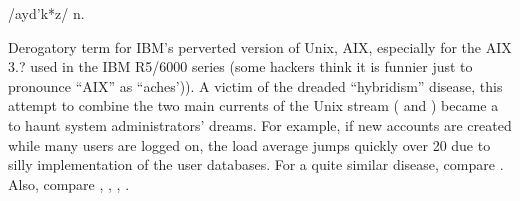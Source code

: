  /ayd'k*z/ n.

Derogatory term for IBM's perverted version of Unix, AIX, especially for the AIX 3.? used in the IBM R5/6000 series (some hackers think it
is funnier just to pronounce ``AIX'' as ``aches')). A victim of the dreaded ``hybridism'' disease, this attempt to combine the two main
currents of the Unix stream ( and ) became a  to haunt system administrators'
dreams. For example, if new accounts are created while many users are logged on, the load average jumps quickly over 20 due to silly
implementation of the user databases. For a quite similar disease, compare . Also, compare ,
, , .

